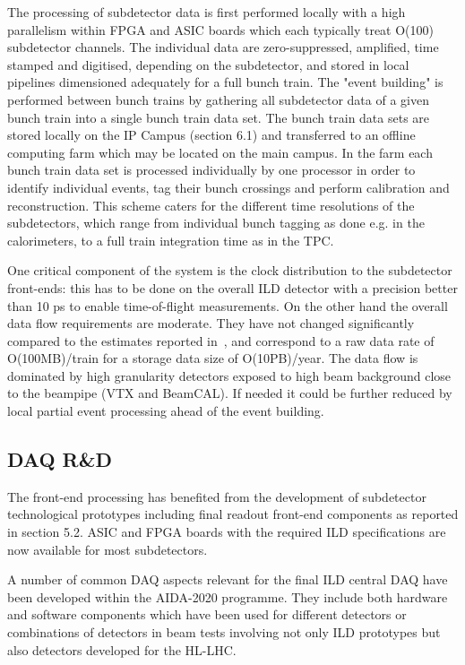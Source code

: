 The processing of subdetector data is first performed locally with a high parallelism within FPGA and ASIC boards which each typically treat O(100) subdetector channels. The individual data are zero-suppressed, amplified, time stamped and digitised, depending on the subdetector, and stored in local pipelines dimensioned adequately for a full bunch train. The "event building" is performed between bunch trains by gathering all subdetector data of a given bunch train into a single bunch train data set. The bunch train data sets are stored locally on the IP Campus (section 6.1) and transferred to an offline computing farm which may be located on the main campus. In the farm each bunch train data set is processed individually by one processor in order to identify individual events, tag their bunch crossings and perform calibration and reconstruction. This scheme caters for the different time resolutions of the subdetectors, which range from individual bunch tagging as done e.g. in the calorimeters, to a full train integration time as in the TPC.

One critical component of the system is the clock distribution to the subdetector front-ends: this has to be done on the overall ILD detector with a precision better than 10 ps to enable time-of-flight measurements. On the other hand the overall data flow requirements are moderate. They have not changed significantly compared to the estimates reported in~\cite{ild:bib:ilddbd}, and correspond to a raw data rate of O(100MB)/train for a storage data size of O(10PB)/year. The data flow is dominated by high granularity detectors exposed to high beam background close to the beampipe (VTX and BeamCAL). If needed it could be further reduced by local partial event processing ahead of the event building.

\subsection{DAQ R\&D}

The front-end processing has benefited from the development of subdetector technological prototypes including final readout front-end components as reported in section 5.2. ASIC and FPGA boards with the required ILD specifications are now available for most subdetectors.

A number of common DAQ aspects relevant for the final ILD central DAQ have been developed \cite{ild:bib:AIDADAQ} within the AIDA-2020 programme. They include both hardware and software components which have been used for different detectors or combinations of detectors in beam tests involving not only ILD prototypes but also detectors developed for the HL-LHC. 


